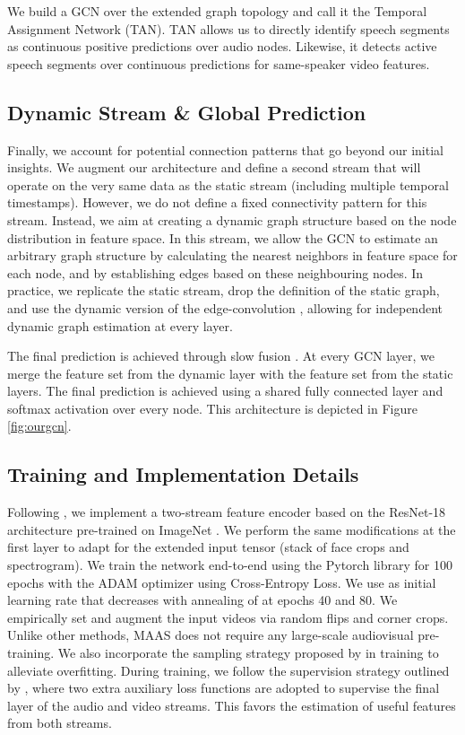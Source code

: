 \documentclass[10pt,twocolumn,letterpaper]{article}
\begin{document}
We build a GCN over the extended graph topology and call it the Temporal Assignment Network (TAN). TAN allows us to directly identify speech segments as continuous positive predictions over audio nodes. Likewise, it detects active speech segments over continuous predictions for same-speaker video features.


\subsection{Dynamic Stream \& Global Prediction}

Finally, we account for potential connection patterns that go beyond our initial insights. We augment our architecture and define a second stream that will operate on the very same data as the static stream (including multiple temporal timestamps). However, we do not define a fixed connectivity pattern for this stream. Instead, we aim at creating a dynamic graph structure based on the node distribution in feature space. In this stream, we allow the GCN to estimate an arbitrary graph structure by calculating the  nearest neighbors in feature space for each node, and by establishing edges based on these neighbouring nodes. In practice, we replicate the static stream, drop the definition of the static graph, and use the dynamic version of the edge-convolution \cite{wang2018dynamic}, allowing for independent dynamic graph estimation at every layer.

The final prediction is achieved through slow fusion \cite{karpathy2014large, g_tad}. At every GCN layer, we merge the feature set from the dynamic layer with the feature set from the static layers. The final prediction is achieved using a shared fully connected layer and softmax activation over every node. This architecture is depicted in Figure \ref{fig:ourgcn}.


\subsection{Training and Implementation Details}

Following \cite{roth2019ava}, we implement a two-stream feature encoder based on the ResNet-18 architecture \cite{he2016deep} pre-trained on ImageNet \cite{deng2009imagenet}. We perform the same modifications at the first layer to adapt for the extended input tensor (stack of face crops and spectrogram). We train the network end-to-end using the Pytorch library \cite{paszke2017automatic} for 100 epochs with the ADAM optimizer \cite{kingma2014adam} using Cross-Entropy Loss.  We use  as initial learning rate that decreases with annealing of  at epochs 40 and 80. We empirically set  and augment the input videos via random flips and corner crops. Unlike other methods, MAAS does not require any large-scale audiovisual pre-training. We also incorporate the sampling strategy proposed by \cite{alcazar2020active} in training to alleviate  overfitting. During training, we follow the supervision strategy outlined by \cite{roth2019ava}, where two extra auxiliary loss functions  are adopted to supervise the final layer of the audio and video streams. This favors the estimation of useful features from both streams. 
\end{document}
